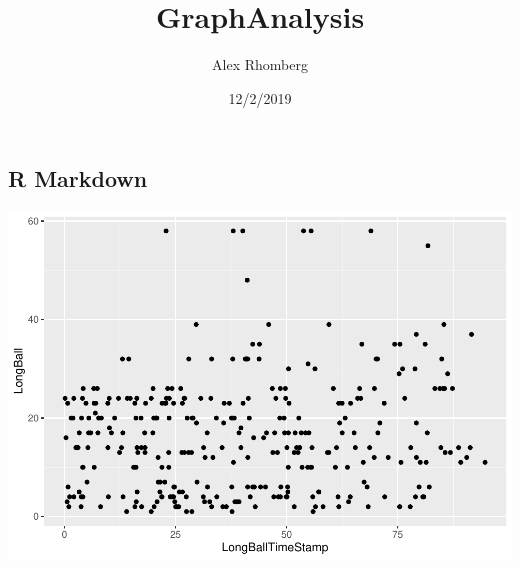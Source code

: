 \documentclass[]{article}
\title{GraphAnalysis}
\author{Alex Rhomberg}
\date{12/2/2019}
\newenvironment{Shaded}{\begin{snugshade}}{\end{snugshade}}
\newcommand{\DecValTok}[1]{\textcolor[rgb]{0.00,0.00,0.81}{#1}}
\newcommand{\KeywordTok}[1]{\textcolor[rgb]{0.13,0.29,0.53}{\textbf{#1}}}
\newcommand{\NormalTok}[1]{#1}
\newcommand{\OperatorTok}[1]{\textcolor[rgb]{0.81,0.36,0.00}{\textbf{#1}}}
\newcommand{\StringTok}[1]{\textcolor[rgb]{0.31,0.60,0.02}{#1}}
\begin{document}
\maketitle

\hypertarget{r-markdown}{%
\subsection{R Markdown}\label{r-markdown}}

\begin{Shaded}
\end{Shaded}

\includegraphics{GraphAnalysis_files/figure-latex/Long Ball Game Duration-1.pdf}

\begin{Shaded}
\end{Shaded}
\end{document}
